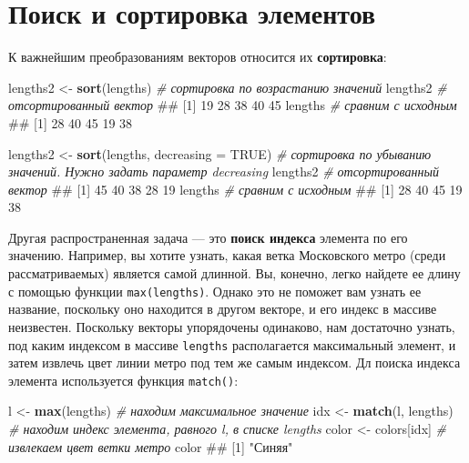 \documentclass[]{book}
\newenvironment{Shaded}{\begin{snugshade}}{\end{snugshade}}
\newcommand{\KeywordTok}[1]{\textcolor[rgb]{0.13,0.29,0.53}{\textbf{#1}}}
\newcommand{\DataTypeTok}[1]{\textcolor[rgb]{0.13,0.29,0.53}{#1}}
\newcommand{\StringTok}[1]{\textcolor[rgb]{0.31,0.60,0.02}{#1}}
\newcommand{\CommentTok}[1]{\textcolor[rgb]{0.56,0.35,0.01}{\textit{#1}}}
\newcommand{\OtherTok}[1]{\textcolor[rgb]{0.56,0.35,0.01}{#1}}
\newcommand{\NormalTok}[1]{#1}
\begin{document}
\section{Поиск и сортировка элементов}\label{vector_search_sorting}

К важнейшим преобразованиям векторов относится их \textbf{сортировка}:

\begin{Shaded}
\begin{Highlighting}[]
\NormalTok{lengths2 <-}\StringTok{ }\KeywordTok{sort}\NormalTok{(lengths) }\CommentTok{# сортировка по возрастанию значений}
\NormalTok{lengths2 }\CommentTok{# отсортированный вектор}
\NormalTok{## [1] 19 28 38 40 45}
\NormalTok{lengths }\CommentTok{# сравним с исходным}
\NormalTok{## [1] 28 40 45 19 38}

\NormalTok{lengths2 <-}\StringTok{ }\KeywordTok{sort}\NormalTok{(lengths, }\DataTypeTok{decreasing =} \OtherTok{TRUE}\NormalTok{) }\CommentTok{# сортировка по убыванию значений. Нужно задать параметр decreasing}
\NormalTok{lengths2 }\CommentTok{# отсортированный вектор}
\NormalTok{## [1] 45 40 38 28 19}
\NormalTok{lengths }\CommentTok{# сравним с исходным}
\NormalTok{## [1] 28 40 45 19 38}
\end{Highlighting}
\end{Shaded}

Другая распространенная задача --- это \textbf{поиск индекса} элемента
по его значению. Например, вы хотите узнать, какая ветка Московского
метро (среди рассматриваемых) является самой длинной. Вы, конечно, легко
найдете ее длину с помощью функции \texttt{max(lengths)}. Однако это не
поможет вам узнать ее название, поскольку оно находится в другом
векторе, и его индекс в массиве неизвестен. Поскольку векторы
упорядочены одинаково, нам достаточно узнать, под каким индексом в
массиве \texttt{lengths} располагается максимальный элемент, и затем
извлечь цвет линии метро под тем же самым индексом. Дл поиска индекса
элемента используется функция \texttt{match()}:

\begin{Shaded}
\begin{Highlighting}[]
\NormalTok{l <-}\StringTok{ }\KeywordTok{max}\NormalTok{(lengths) }\CommentTok{# находим максимальное значение}
\NormalTok{idx <-}\StringTok{ }\KeywordTok{match}\NormalTok{(l, lengths) }\CommentTok{# находим индекс элемента, равного l, в списке lengths}
\NormalTok{color <-}\StringTok{ }\NormalTok{colors[idx] }\CommentTok{# извлекаем цвет ветки метро}
\NormalTok{color}
\NormalTok{## [1] "Синяя"}
\end{Highlighting}
\end{Shaded}
\end{document}
